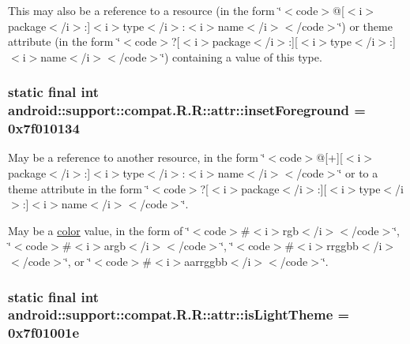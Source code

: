 This may also be a reference to a resource (in the form \char`\"{}$<$code$>$@\mbox{[}$<$i$>$package$<$/i$>$:\mbox{]}$<$i$>$type$<$/i$>$:$<$i$>$name$<$/i$>$$<$/code$>$\char`\"{}) or theme attribute (in the form \char`\"{}$<$code$>$?\mbox{[}$<$i$>$package$<$/i$>$:\mbox{]}\mbox{[}$<$i$>$type$<$/i$>$:\mbox{]}$<$i$>$name$<$/i$>$$<$/code$>$\char`\"{}) containing a value of this type. \hypertarget{classandroid_1_1support_1_1compat_1_1_r_1_1attr_f0d7e427e3eec380babcfca726025004}{
\subsubsection[{insetForeground}]{\setlength{\rightskip}{0pt plus 5cm}static final int android::support::compat.R.R::attr::insetForeground = 0x7f010134}}
\label{classandroid_1_1support_1_1compat_1_1_r_1_1attr_f0d7e427e3eec380babcfca726025004}


May be a reference to another resource, in the form \char`\"{}$<$code$>$@\mbox{[}+\mbox{]}\mbox{[}$<$i$>$package$<$/i$>$:\mbox{]}$<$i$>$type$<$/i$>$:$<$i$>$name$<$/i$>$$<$/code$>$\char`\"{} or to a theme attribute in the form \char`\"{}$<$code$>$?\mbox{[}$<$i$>$package$<$/i$>$:\mbox{]}\mbox{[}$<$i$>$type$<$/i$>$:\mbox{]}$<$i$>$name$<$/i$>$$<$/code$>$\char`\"{}. 

May be a \hyperlink{classandroid_1_1support_1_1compat_1_1_r_1_1color}{color} value, in the form of \char`\"{}$<$code$>$\#$<$i$>$rgb$<$/i$>$$<$/code$>$\char`\"{}, \char`\"{}$<$code$>$\#$<$i$>$argb$<$/i$>$$<$/code$>$\char`\"{}, \char`\"{}$<$code$>$\#$<$i$>$rrggbb$<$/i$>$$<$/code$>$\char`\"{}, or \char`\"{}$<$code$>$\#$<$i$>$aarrggbb$<$/i$>$$<$/code$>$\char`\"{}. \hypertarget{classandroid_1_1support_1_1compat_1_1_r_1_1attr_721d7895c37892f134947c06978ea98b}{
\subsubsection[{isLightTheme}]{\setlength{\rightskip}{0pt plus 5cm}static final int android::support::compat.R.R::attr::isLightTheme = 0x7f01001e}}
\label{classandroid_1_1support_1_1compat_1_1_r_1_1attr_721d7895c37892f134947c06978ea98b}


